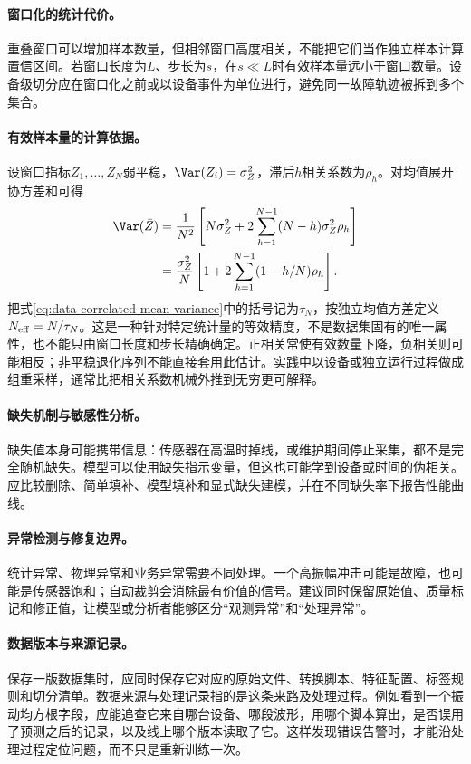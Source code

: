 \paragraph{窗口化的统计代价。}
重叠窗口可以增加样本数量，但相邻窗口高度相关，不能把它们当作独立样本计算置信区间。若窗口长度为$L$、步长为$s$，在$s\ll L$时有效样本量远小于窗口数量。设备级切分应在窗口化之前或以设备事件为单位进行，避免同一故障轨迹被拆到多个集合。

\paragraph{有效样本量的计算依据。}
设窗口指标$Z_1,\ldots,Z_N$弱平稳，$\Var(Z_i)=\sigma_Z^2$，滞后$h$相关系数为$\rho_h$。对均值展开协方差和可得
\begin{align}
 \Var(\bar Z)
 &=\frac1{N^2}\left[N\sigma_Z^2+2\sum_{h=1}^{N-1}(N-h)\sigma_Z^2\rho_h\right]\\
 &=\frac{\sigma_Z^2}{N}\left[1+2\sum_{h=1}^{N-1}(1-h/N)\rho_h\right].\label{eq:data-correlated-mean-variance}
\end{align}
把式\eqref{eq:data-correlated-mean-variance}中的括号记为$\tau_N$，按独立均值方差定义$N_{\rm eff}=N/\tau_N$。这是一种针对特定统计量的等效精度，不是数据集固有的唯一属性，也不能只由窗口长度和步长精确确定。正相关常使有效数量下降，负相关则可能相反；非平稳退化序列不能直接套用此估计。实践中以设备或独立运行过程做成组重采样，通常比把相关系数机械外推到无穷更可解释。

\paragraph{缺失机制与敏感性分析。}
缺失值本身可能携带信息：传感器在高温时掉线，或维护期间停止采集，都不是完全随机缺失。模型可以使用缺失指示变量，但这也可能学到设备或时间的伪相关。应比较删除、简单填补、模型填补和显式缺失建模，并在不同缺失率下报告性能曲线。

\paragraph{异常检测与修复边界。}
统计异常、物理异常和业务异常需要不同处理。一个高振幅冲击可能是故障，也可能是传感器饱和；自动裁剪会消除最有价值的信号。建议同时保留原始值、质量标记和修正值，让模型或分析者能够区分“观测异常”和“处理异常”。

\paragraph{数据版本与来源记录。}
保存一版数据集时，应同时保存它对应的原始文件、转换脚本、特征配置、标签规则和切分清单。数据来源与处理记录指的是这条来路及处理过程。例如看到一个振动均方根字段，应能追查它来自哪台设备、哪段波形，用哪个脚本算出，是否误用了预测之后的记录，以及线上哪个版本读取了它。这样发现错误告警时，才能沿处理过程定位问题，而不只是重新训练一次。

